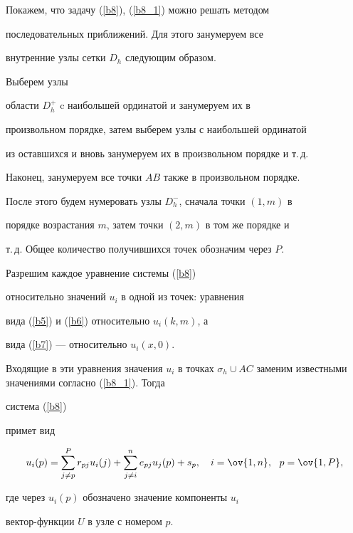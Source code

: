 Покажем, что задачу (\ref{b8}), (\ref{b8_1}) можно решать методом


последовательных приближений. Для этого занумеруем все


внутренние узлы сетки $D_h$ следующим образом.


Выберем узлы


области $D_h^+$ c наибольшей ординатой и занумеруем их в


произвольном порядке, затем выберем узлы с наибольшей ординатой 


из оставшихся и вновь занумеруем их в произвольном порядке и т.\,д.


Наконец, занумеруем все точки $AB$ также в произвольном порядке.


После этого будем нумеровать узлы $D_h^-$, сначала точки $(1,m)$ в


порядке возрастания $m$, затем точки $(2,m)$ в том же порядке и


т.\,д. Общее количество получившихся точек обозначим через $P$.





Разрешим каждое уравнение системы (\ref{b8})


относительно значений $u_i$ в одной из точек: уравнения


вида (\ref{b5}) и (\ref{b6}) относительно $u_i(k,m)$, а


вида (\ref{b7}) --- относительно $u_i(x,0)$.


Входящие в эти уравнения значения $u_i$ в точках $\sigma_h \cup


AC$ заменим известными значениями согласно (\ref{b8_1}). Тогда


система (\ref{b8})


примет вид


\begin{equation}\label{23}


u_{i}(p) =\sum_{j\ne p}^{P}r_{pj}u_{i}(j)


+ \sum_{j\ne i}^n e_{pj} u_{j}(p) + s_{p},


\quad i=\ov{1,n},\ \ p=\ov{1,P},


\end{equation}


где через $u_{i}(p)$ обозначено значение компоненты $u_i$ 


вектор-функции $U$ в узле с номером $p$.








